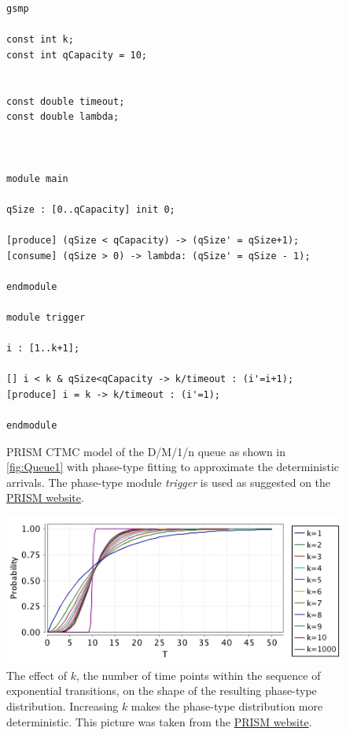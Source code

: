 \documentclass[paper=a4, fontsize=11pt]{scrartcl}
\numberwithin{equation}{section}		%
\numberwithin{figure}{section}			%
\numberwithin{table}{section}				%
\begin{document}
	\begin{figure}
		\centering
		\begin{lstlisting}
gsmp

const int k;
const int qCapacity = 10;


const double timeout;
const double lambda;



module main

qSize : [0..qCapacity] init 0;

[produce] (qSize < qCapacity) -> (qSize' = qSize+1);
[consume] (qSize > 0) -> lambda: (qSize' = qSize - 1);

endmodule

module trigger

i : [1..k+1];

[] i < k & qSize<qCapacity -> k/timeout : (i'=i+1);
[produce] i = k -> k/timeout : (i'=1);

endmodule
		\end{lstlisting}
		\caption{PRISM CTMC model of the D/M/1/n queue as shown in \ref{fig:Queue1} with phase-type fitting to approximate the deterministic arrivals. The phase-type module \emph{trigger} is used as suggested on the \href{http://www.prismmodelchecker.org/manual/FrequentlyAskedQuestions/PRISMModelling}{PRISM website}.  }
		\label{fig:queuecode2}
	\end{figure}
	
	\begin{figure}
		\centering
		\includegraphics[width=12cm]{picture/faq-erlang.jpg}
		\caption{The effect of $k$, the number of time points within the sequence of exponential transitions, on the shape of the resulting phase-type distribution. Increasing $k$ makes the phase-type distribution more deterministic. This picture was taken from the \href{http://www.prismmodelchecker.org/manual/FrequentlyAskedQuestions/PRISMModelling}{PRISM website}.}
		\label{fig:time1}
	\end{figure}
	
	
	
\end{document}
